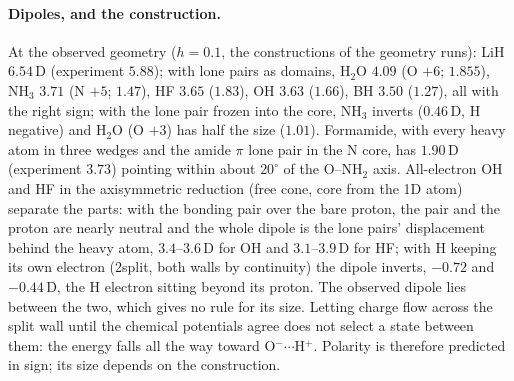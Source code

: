 \paragraph{Dipoles, and the construction.} At the observed geometry ($h = 0.1$, the constructions of the
geometry runs): LiH $6.54$\,D (experiment $5.88$); with lone pairs as domains, H$_2$O $4.09$ (O $+6$; $1.855$),
NH$_3$ $3.71$ (N $+5$; $1.47$), HF $3.65$ ($1.83$), OH $3.63$ ($1.66$), BH $3.50$ ($1.27$), all with the right sign;
with the lone pair frozen into the core, NH$_3$ inverts ($0.46$\,D, H negative) and H$_2$O (O $+3$) has half the
size ($1.01$). Formamide, with every heavy atom in three wedges and the amide $\pi$ lone pair in the N core, has
$1.90$\,D (experiment $3.73$) pointing within about $20^\circ$ of the O--NH$_2$ axis. All-electron OH and HF in the
axisymmetric reduction (free cone, core from the 1D atom) separate the parts: with the bonding pair over the bare
proton, the pair and the proton are nearly neutral and the whole dipole is the lone pairs' displacement behind
the heavy atom, $3.4$--$3.6$\,D for OH and $3.1$--$3.9$\,D for HF; with H keeping its own electron (2split, both
walls by continuity) the dipole inverts, $-0.72$ and $-0.44$\,D, the H electron sitting beyond its proton. The
observed dipole lies between the two, which gives no rule for its size. Letting charge flow across the
split wall until the chemical potentials agree does not select a state between them: the energy falls all the
way toward O$^-\cdots$H$^+$. Polarity is therefore predicted in sign; its size depends on the construction.


